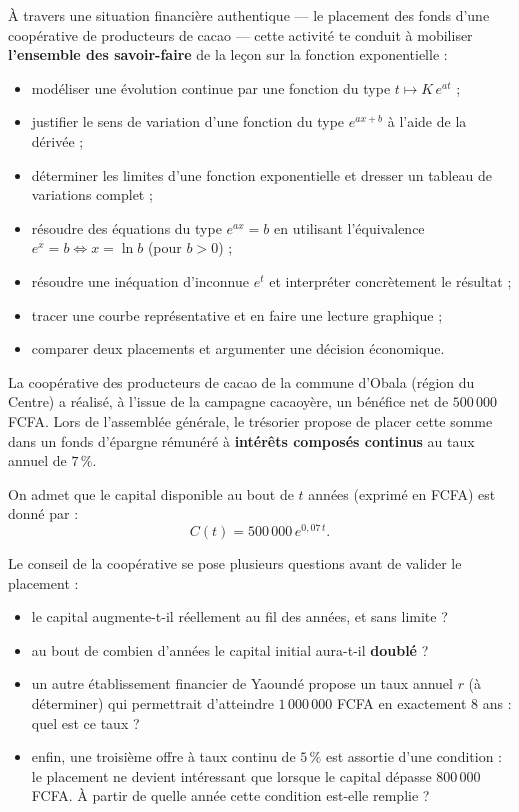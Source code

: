 \documentclass[11pt]{article}
\newcounter{popsec}
\newcounter{popsub}
\newcommand{\courssub}[1]{%
  \stepcounter{popsub}%
  \par\vspace{9pt}\noindent{\popxbold\fontsize{11.5}{13}\selectfont\color{popink}{\color{poporange}\thepopsec.\thepopsub}\hspace{6pt}#1}\par\nopagebreak\vspace{4pt}
}
\begin{document}
À travers une situation financière authentique — le placement des fonds d'une coopérative de producteurs de cacao — cette activité te conduit à mobiliser \textbf{l'ensemble des savoir-faire} de la leçon sur la fonction exponentielle :

\begin{itemize}
\item modéliser une évolution continue par une fonction du type $t \mapsto K\,e^{at}$ ;
\item justifier le sens de variation d'une fonction du type $e^{ax+b}$ à l'aide de la dérivée ;
\item déterminer les limites d'une fonction exponentielle et dresser un tableau de variations complet ;
\item résoudre des équations du type $e^{ax} = b$ en utilisant l'équivalence $e^{x} = b \iff x = \ln b$ (pour $b > 0$) ;
\item résoudre une inéquation d'inconnue $e^{t}$ et interpréter concrètement le résultat ;
\item tracer une courbe représentative et en faire une lecture graphique ;
\item comparer deux placements et argumenter une décision économique.
\end{itemize}

\courssub{Situation}

La coopérative des producteurs de cacao de la commune d'Obala (région du Centre) a réalisé, à l'issue de la campagne cacaoyère, un bénéfice net de $500\,000$ FCFA. Lors de l'assemblée générale, le trésorier propose de placer cette somme dans un fonds d'épargne rémunéré à \textbf{intérêts composés continus} au taux annuel de $7\,\%$.

On admet que le capital disponible au bout de $t$ années (exprimé en FCFA) est donné par :
\[ C(t) = 500\,000\,e^{0,07\,t}. \]

Le conseil de la coopérative se pose plusieurs questions avant de valider le placement :

\begin{itemize}
\item le capital augmente-t-il réellement au fil des années, et sans limite ?
\item au bout de combien d'années le capital initial aura-t-il \textbf{doublé} ?
\item un autre établissement financier de Yaoundé propose un taux annuel $r$ (à déterminer) qui permettrait d'atteindre $1\,000\,000$ FCFA en exactement $8$ ans : quel est ce taux ?
\item enfin, une troisième offre à taux continu de $5\,\%$ est assortie d'une condition : le placement ne devient intéressant que lorsque le capital dépasse $800\,000$ FCFA. À partir de quelle année cette condition est-elle remplie ?
\end{itemize}
\end{document}
